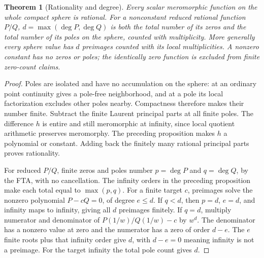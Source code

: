 \documentclass[11pt,a4paper,openany]{book}
\newtheorem{theorem}{Theorem}[chapter]
\theoremstyle{definition}
\theoremstyle{remark}\newtheorem{remark}[theorem]{Remark}
\newcommand{\family}[1]{}
\begin{document}
\begin{theorem}[Rationality and degree]\family{D12.07.06}\label{d12:07-06}
Every scalar meromorphic function on the whole compact sphere is rational.
For a nonconstant reduced rational function \(P/Q\),
\(d=\max(\deg P,\deg Q)\) is both the total number of its zeros and the
total number of its poles on the sphere, counted with multiplicity.
More generally every sphere value has \(d\) preimages counted with its
local multiplicities. A nonzero constant has no zeros or poles;
the identically zero function is excluded from finite zero-count claims.
\end{theorem}
\begin{proof}
Poles are isolated and have no accumulation on the sphere: at an ordinary
point continuity gives a pole-free neighborhood, and at a pole its
local factorization excludes other poles nearby. Compactness therefore
makes their number finite. Subtract the finite Laurent principal parts
at all finite poles. The difference \(h\) is entire and still
meromorphic at infinity, since local quotient arithmetic preserves
meromorphy. The preceding proposition makes \(h\) a polynomial or
constant. Adding back the finitely many rational principal parts proves
rationality.

For reduced \(P/Q\), finite zeros and poles number \(p=\deg P\) and
\(q=\deg Q\), by the FTA, with no cancellation. The infinity orders in
the preceding proposition make each total equal to \(\max(p,q)\).
For a finite target \(c\), preimages solve the nonzero polynomial
\(P-cQ=0\), of degree \(e\le d\).
If \(q<d\), then \(p=d\), \(e=d\), and infinity maps to infinity,
giving all \(d\) preimages finitely.
If \(q=d\), multiply numerator and denominator of
\(P(1/w)/Q(1/w)-c\) by \(w^d\).
The denominator has a nonzero value at zero and the numerator has a
zero of order \(d-e\). The \(e\) finite roots plus that infinity order
give \(d\), with \(d-e=0\) meaning infinity is not a preimage.
For the target infinity the total pole count gives \(d\).
\end{proof}
\end{document}
